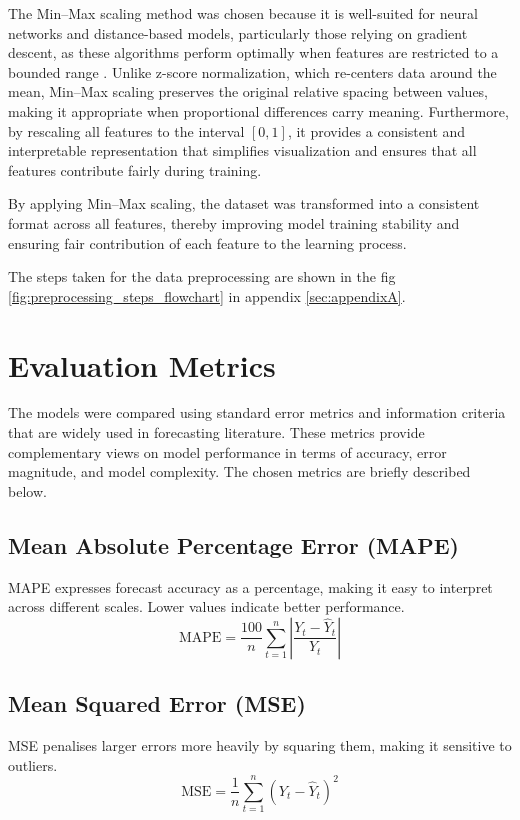 The Min–Max scaling method was chosen because it is well-suited for neural networks and distance-based models, particularly those relying on gradient descent, as these algorithms perform optimally when features are restricted to a bounded range \cite{featureScaling}. Unlike z-score normalization, which re-centers data around the mean, Min–Max scaling preserves the original relative spacing between values, making it appropriate when proportional differences carry meaning. Furthermore, by rescaling all features to the interval \([0,1]\), it provides a consistent and interpretable representation that simplifies visualization and ensures that all features contribute fairly during training.

By applying Min–Max scaling, the dataset was transformed into a consistent format across all features, thereby improving model training stability and ensuring fair contribution of each feature to the learning process.


The steps taken for the data preprocessing are shown in the fig \ref{fig:preprocessing_steps_flowchart} in appendix \ref{sec:appendixA}. 

\section{Evaluation Metrics \label{sec:eval_metrics}}
The models were compared using standard error metrics and information criteria that are widely used in forecasting literature. These metrics provide complementary views on model performance in terms of accuracy, error magnitude, and model complexity. The chosen metrics are briefly described below. 

\subsection{Mean Absolute Percentage Error (MAPE)} 
MAPE expresses forecast accuracy as a percentage, making it easy to interpret across different scales. Lower values indicate better performance.  
\[
\text{MAPE} = \frac{100}{n}\sum_{t=1}^{n} \left| \frac{Y_t - \hat{Y}_t}{Y_t} \right|
\]

\subsection{Mean Squared Error (MSE)} 
MSE penalises larger errors more heavily by squaring them, making it sensitive to outliers.  
\[
\text{MSE} = \frac{1}{n}\sum_{t=1}^{n} (Y_t - \hat{Y}_t)^2
\]

